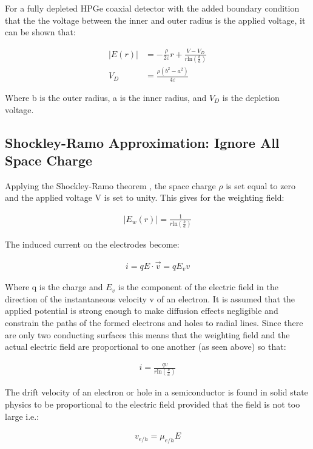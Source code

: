 For a fully depleted HPGe coaxial detector with the added boundary condition that the the voltage between the inner and outer radius is the applied voltage, it can be shown that:

\begin{align}
|E(r)| &= -\frac{\rho}{2\varepsilon}r + \frac{V - V_{D}}{r \mathrm{ln}\left(\frac{b}{a}\right)}\\
V_{D} &= \frac{\rho (b^{2} - a^{2})}{4 \varepsilon} \nonumber
\end{align}

Where b is the outer radius, a is the inner radius, and $V_{D}$ is the depletion voltage.
\subsection*{Shockley-Ramo Approximation: Ignore All Space Charge}
Applying the Shockley-Ramo theorem \cite{ramo,Shockley}, the space charge $\rho$ is set equal to zero and the applied voltage V is set to unity. This gives for the weighting field:

\begin{align}
    |E_{w}(r)| = \frac{1}{r\mathrm{ln}\left(\frac{b}{a}\right)}
\end{align}

The induced current on the electrodes become:

\begin{align}
    i = q E \cdot \vec{v} = q E_{v} v
\end{align}

Where q is the charge and $E_{v}$ is the component of the electric field in the direction of the instantaneous velocity v of an electron. It is assumed that the applied potential is strong enough to make diffusion effects negligible and constrain the paths of the formed electrons and holes to radial lines. Since there are only two conducting surfaces this means that the weighting field and the actual electric field are proportional to one another (as seen above) so that:

\begin{align}
    i = \frac{qv}{r\mathrm{ln}\left(\frac{b}{a}\right)}
\end{align}

The drift velocity of an electron or hole in a semiconductor is found in solid state physics to be proportional to the electric field provided that the field is not too large i.e.:

\begin{align}\label{velocity}
    v_{e/h} = \mu_{e/h} E
\end{align}

